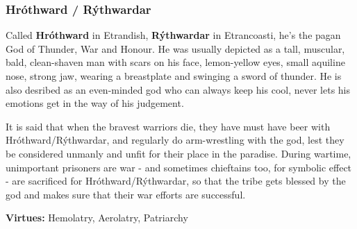 \subsubsection{Hróthward / Rýthwardar}

Called \textbf{Hróthward} in Etrandish, \textbf{Rýthwardar} in Etrancoasti, he's the pagan God of Thunder, War and Honour. He was usually depicted as a tall, muscular, bald, clean-shaven man with scars on his face, lemon-yellow eyes, small aquiline nose, strong jaw, wearing a breastplate and swinging a sword of thunder. He is also desribed as an even-minded god who can always keep his cool, never lets his emotions get in the way of his judgement.

It is said that when the bravest warriors die, they have must have beer with Hróthward/Rýthwardar, and regularly do arm-wrestling with the god, lest they be considered unmanly and unfit for their place in the paradise. During wartime, unimportant prisoners are war - and sometimes chieftains too, for symbolic effect - are sacrificed for Hróthward/Rýthwardar, so that the tribe gets blessed by the god and makes sure that their war efforts are successful.


\textbf{Virtues:} Hemolatry, Aerolatry, Patriarchy

